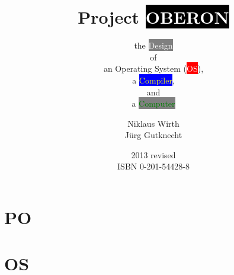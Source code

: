 \documentclass[a5paper,footinclude=true,headinclude=true]{scrbook}
\begin{document}
\title{Project \colorbox{black}{\textcolor{white}{OBERON}}}
\subtitle{ the \colorbox{gray}{\textcolor{white}{Design}}\\of\\an Operating System
              (\colorbox{red}{\textcolor{white}{OS}}),\\a
               \colorbox{blue}{\textcolor{yellow}{Compiler}},\\and\\a
               \colorbox{gray}{\textcolor{green}{Computer}}}
\author{Niklaus Wirth\\Jürg Gutknecht}
\date{2013 revised\\ISBN 0-201-54428-8}
\maketitle
\part*{PO}


\part{OS}











%
%
%
%
%
%
%
%
%
%
%
%
%
%
%
%
%
%
\end{document}
